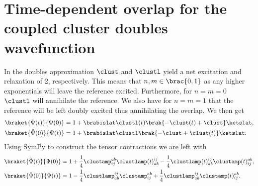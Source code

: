     \section{Time-dependent overlap for the coupled cluster doubles
    wavefunction}
        In the doubles approximation $\clust$ and $\clustl$ yield a net
        excitation and relaxation of 2, respectively. This means that $n, m \in
        \brac{0, 1}$ as any higher exponentials will leave the reference
        excited. Furthermore, for $n = m = 0$ $\clustl$ will annihilate the
        reference. We also have for $n = m = 1$ that the reference will be left
        doubly excited thus annihilating the overlap. We then get
        \begin{align}
            \braket{\tilde{\Psi}(t)}{\Psi(0)}
            &= 1 + \brabislat\clustl(t)\brak{
                -\clust(t) + \clust
            }\ketslat,
            \\
            \braket{\tilde{\Psi}(0)}{\Psi(t)}
            &= 1 + \brabislat\clustl\brak{
                -\clust + \clust(t)
            }\ketslat.
        \end{align}
        Using SymPy \cite{sympy} to construct the tensor contractions we are
        left with
        \begin{align}
            \braket{\tilde{\Psi}(t)}{\Psi(0)}
            &= 1 + \frac{1}{4}\clustamp^{ab}_{ij} \clustlamp(t)^{ij}_{ab}
            - \frac{1}{4}\clustlamp(t)^{ij}_{ab}
            \clustamp(t)^{ab}_{ij},
            \\
            \braket{\tilde{\Psi}(0)}{\Psi(t)}
            &= 1 - \frac{1}{4}\clustlamp^{ij}_{ab} \clustamp^{ab}_{ij}
            + \frac{1}{4}\clustlamp^{ij}_{ab}
            \clustamp(t)^{ab}_{ij}.
        \end{align}

